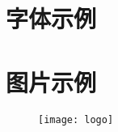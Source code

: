 \documentclass[a4paper,11pt,UTF8,AutoFakeBold]{ctexart}
\begin{document}
\begin{appendix}
\section{字体示例}

\section{图片示例}

\begin{figure}[!htbp]
\centering
\texttt{[image: logo]}
\end{figure}

\end{appendix}
\end{document}
